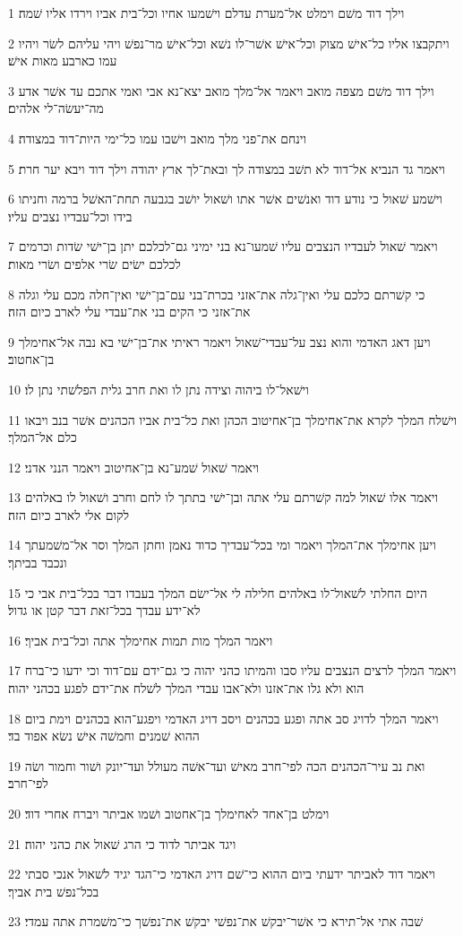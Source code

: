 \par 1 וילך דוד משׁם וימלט אל־מערת עדלם וישׁמעו אחיו וכל־בית אביו וירדו אליו שׁמה׃
\par 2 ויתקבצו אליו כל־אישׁ מצוק וכל־אישׁ אשׁר־לו נשׁא וכל־אישׁ מר־נפשׁ ויהי עליהם לשׂר ויהיו עמו כארבע מאות אישׁ׃
\par 3 וילך דוד משׁם מצפה מואב ויאמר אל־מלך מואב יצא־נא אבי ואמי אתכם עד אשׁר אדע מה־יעשׂה־לי אלהים׃
\par 4 וינחם את־פני מלך מואב וישׁבו עמו כל־ימי היות־דוד במצודה׃
\par 5 ויאמר גד הנביא אל־דוד לא תשׁב במצודה לך ובאת־לך ארץ יהודה וילך דוד ויבא יער חרת׃
\par 6 וישׁמע שׁאול כי נודע דוד ואנשׁים אשׁר אתו ושׁאול יושׁב בגבעה תחת־האשׁל ברמה וחניתו בידו וכל־עבדיו נצבים עליו׃
\par 7 ויאמר שׁאול לעבדיו הנצבים עליו שׁמעו־נא בני ימיני גם־לכלכם יתן בן־ישׁי שׂדות וכרמים לכלכם ישׂים שׂרי אלפים ושׂרי מאות׃
\par 8 כי קשׁרתם כלכם עלי ואין־גלה את־אזני בכרת־בני עם־בן־ישׁי ואין־חלה מכם עלי וגלה את־אזני כי הקים בני את־עבדי עלי לארב כיום הזה׃
\par 9 ויען דאג האדמי והוא נצב על־עבדי־שׁאול ויאמר ראיתי את־בן־ישׁי בא נבה אל־אחימלך בן־אחטוב׃
\par 10 וישׁאל־לו ביהוה וצידה נתן לו ואת חרב גלית הפלשׁתי נתן לו׃
\par 11 וישׁלח המלך לקרא את־אחימלך בן־אחיטוב הכהן ואת כל־בית אביו הכהנים אשׁר בנב ויבאו כלם אל־המלך׃
\par 12 ויאמר שׁאול שׁמע־נא בן־אחיטוב ויאמר הנני אדני׃
\par 13 ויאמר אלו שׁאול למה קשׁרתם עלי אתה ובן־ישׁי בתתך לו לחם וחרב ושׁאול לו באלהים לקום אלי לארב כיום הזה׃
\par 14 ויען אחימלך את־המלך ויאמר ומי בכל־עבדיך כדוד נאמן וחתן המלך וסר אל־משׁמעתך ונכבד בביתך׃
\par 15 היום החלתי לשׁאול־לו באלהים חלילה לי אל־ישׂם המלך בעבדו דבר בכל־בית אבי כי לא־ידע עבדך בכל־זאת דבר קטן או גדול׃
\par 16 ויאמר המלך מות תמות אחימלך אתה וכל־בית אביך׃
\par 17 ויאמר המלך לרצים הנצבים עליו סבו והמיתו כהני יהוה כי גם־ידם עם־דוד וכי ידעו כי־ברח הוא ולא גלו את־אזנו ולא־אבו עבדי המלך לשׁלח את־ידם לפגע בכהני יהוה׃
\par 18 ויאמר המלך לדויג סב אתה ופגע בכהנים ויסב דויג האדמי ויפגע־הוא בכהנים וימת ביום ההוא שׁמנים וחמשׁה אישׁ נשׂא אפוד בד׃
\par 19 ואת נב עיר־הכהנים הכה לפי־חרב מאישׁ ועד־אשׁה מעולל ועד־יונק ושׁור וחמור ושׂה לפי־חרב׃
\par 20 וימלט בן־אחד לאחימלך בן־אחטוב ושׁמו אביתר ויברח אחרי דוד׃
\par 21 ויגד אביתר לדוד כי הרג שׁאול את כהני יהוה׃
\par 22 ויאמר דוד לאביתר ידעתי ביום ההוא כי־שׁם דויג האדמי כי־הגד יגיד לשׁאול אנכי סבתי בכל־נפשׁ בית אביך׃
\par 23 שׁבה אתי אל־תירא כי אשׁר־יבקשׁ את־נפשׁי יבקשׁ את־נפשׁך כי־משׁמרת אתה עמדי׃

